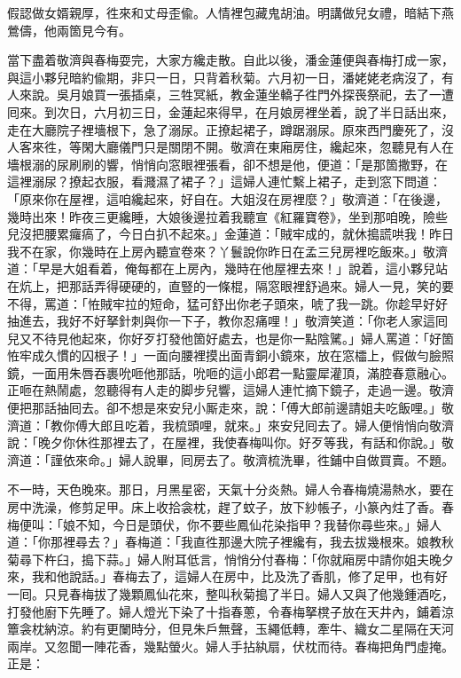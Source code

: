 \begin{myquote}
假認做女婿親厚，徃來和丈母歪偸。人情裡包藏鬼胡油。明講做兒女禮，暗結下燕鶯儔，他兩箇見今有。
\end{myquote}

當下盡着敬濟與春梅耍完，大家方纔走散。自此以後，潘金蓮便與春梅打成一家，與這小夥兒暗約偸期，非只一日，只背着秋菊。六月初一日，潘姥姥老病沒了，有人來說。吳月娘買一張插桌，三牲冥紙，教金蓮坐轎子徃門外探䘮祭祀，去了一遭囘來。到次日，六月初三日，金蓮起來得早，在月娘房裡坐着，說了半日話出來，走在大廳院子裡墻根下，急了溺尿。正撩起裙子，蹲踞溺尿。原來西門慶死了，沒人客來徃，等閑大廳儀門只是關閉不開。敬濟在東廂房住，纔起來，忽聽見有人在墻根溺的尿刷刷的響，悄悄向窓眼裡張看，卻不想是他，便道：「是那箇撒野，在這裡溺尿？撩起衣服，看濺濕了裙子？」這婦人連忙繫上裙子，走到窓下問道：「原來你在屋裡，這咱纔起來，好自在。大姐沒在房裡麼？」敬濟道：「在後邊，幾時出來！昨夜三更纔睡，大娘後邊拉着我聽宣《紅羅寶卷》，坐到那咱晚，險些兒沒把腰累㿚瘑了，今日白扒不起來。」{}金蓮道：「賊牢成的，就休搗謊哄我！昨日我不在家，你幾時在上房內聽宣卷來？丫鬟說你昨日在孟三兒房裡吃飯來。」{}敬濟道：「早是大姐看着，俺每都在上房內，幾時在他屋裡去來！」說着，這小夥兒站在炕上，把那話弄得硬硬的，直豎的一條棍，隔窓眼裡舒過來。{}婦人一見，笑的要不得，{}罵道：「恠賊牢拉的短命，猛可舒出你老子頭來，唬了我一跳。你趁早好好抽進去，我好不好拏針刺與你一下子，教你忍痛哩！」敬濟笑道：「你老人家這囘兒又不待見他起來，你好歹打發他箇好處去，也是你一點陰騭。」{}婦人罵道：「好箇恠牢成久慣的囚根子！」一面向腰裡摸出面青銅小鏡來，放在窓櫺上，假做勻臉照鏡，一面用朱唇吞裹吮咂他那話，{}吮咂的這小郎君一點靈犀灌頂，滿腔春意融心。正咂在熱鬧處，忽聽得有人走的脚步兒響，這婦人連忙摘下鏡子，走過一邊。敬濟便把那話抽囘去。卻不想是來安兒小厮走來，說：「傅大郎前邊請姐夫吃飯哩。」敬濟道：「教你傅大郎且吃着，我梳頭哩，就來。」來安兒囘去了。婦人便悄悄向敬濟說：「晚夕你休徃那裡去了，在屋裡，我使春梅叫你。好歹等我，有話和你說。」敬濟道：「謹依來命。」婦人說畢，囘房去了。敬濟梳洗畢，徃鋪中自做買賣。不題。

不一時，天色晚來。那日，月黑星密，天氣十分炎熱。婦人令春梅燒湯熱水，要在房中洗澡，修剪足甲。床上收拾衾枕，趕了蚊子，放下紗帳子，小篆內炷了香。春梅便叫：「娘不知，今日是頭伏，你不要些鳳仙花染指甲？我替你尋些來。」{}婦人道：「你那裡尋去？」春梅道：「我直徃那邊大院子裡纔有，我去拔幾根來。娘教秋菊尋下杵臼，搗下蒜。」婦人附耳低言，悄悄分付春梅：「你就廂房中請你姐夫晚夕來，我和他說話。」春梅去了，這婦人在房中，比及洗了香肌，修了足甲，也有好一囘。只見春梅拔了幾顆鳳仙花來，整叫秋菊搗了半日。婦人又與了他幾鍾酒吃，打發他廚下先睡了。婦人燈光下染了十指春蔥，令春梅拏櫈子放在天井內，鋪着涼簟衾枕納涼。約有更闌時分，但見朱戶無聲，玉繩低轉，牽牛、織女二星隔在天河兩岸。又忽聞一陣花香，幾點螢火。婦人手拈紈扇，伏枕而待。春梅把角門虛掩。正是：

